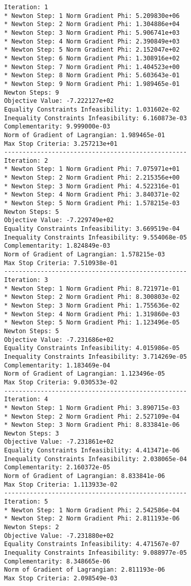 \documentclass{article}
\begin{document}
\scriptsize
\begin{minipage}[t]{0.45\textwidth}
\begin{verbatim}
Iteration: 1
* Newton Step: 1 Norm Gradient Phi: 5.209830e+06
* Newton Step: 2 Norm Gradient Phi: 1.304886e+04
* Newton Step: 3 Norm Gradient Phi: 5.906741e+03
* Newton Step: 4 Norm Gradient Phi: 2.390849e+03
* Newton Step: 5 Norm Gradient Phi: 2.152047e+02
* Newton Step: 6 Norm Gradient Phi: 1.308916e+02
* Newton Step: 7 Norm Gradient Phi: 1.404523e+00
* Newton Step: 8 Norm Gradient Phi: 5.603643e-01
* Newton Step: 9 Norm Gradient Phi: 1.989465e-01
Newton Steps: 9
Objective Value: -7.222127e+02
Equality Constraints Infeasibility: 1.031602e-02
Inequality Constraints Infeasibility: 6.160873e-03
Complementarity: 9.999000e-03
Norm of Gradient of Lagrangian: 1.989465e-01
Max Stop Criteria: 3.257213e+01
--------------------------------------------------
Iteration: 2
* Newton Step: 1 Norm Gradient Phi: 7.075971e+01
* Newton Step: 2 Norm Gradient Phi: 2.215356e+00
* Newton Step: 3 Norm Gradient Phi: 4.522316e-01
* Newton Step: 4 Norm Gradient Phi: 3.840371e-02
* Newton Step: 5 Norm Gradient Phi: 1.578215e-03
Newton Steps: 5
Objective Value: -7.229749e+02
Equality Constraints Infeasibility: 3.669519e-04
Inequality Constraints Infeasibility: 9.554068e-05
Complementarity: 1.824849e-03
Norm of Gradient of Lagrangian: 1.578215e-03
Max Stop Criteria: 7.510938e-01
--------------------------------------------------
Iteration: 3
* Newton Step: 1 Norm Gradient Phi: 8.721971e-01
* Newton Step: 2 Norm Gradient Phi: 8.300803e-02
* Newton Step: 3 Norm Gradient Phi: 1.755636e-02
* Newton Step: 4 Norm Gradient Phi: 1.319860e-03
* Newton Step: 5 Norm Gradient Phi: 1.123496e-05
Newton Steps: 5
Objective Value: -7.231686e+02
Equality Constraints Infeasibility: 4.015986e-05
Inequality Constraints Infeasibility: 3.714269e-05
Complementarity: 1.183469e-04
Norm of Gradient of Lagrangian: 1.123496e-05
Max Stop Criteria: 9.030533e-02
--------------------------------------------------
Iteration: 4
* Newton Step: 1 Norm Gradient Phi: 3.890715e-03
* Newton Step: 2 Norm Gradient Phi: 2.527109e-04
* Newton Step: 3 Norm Gradient Phi: 8.833841e-06
Newton Steps: 3
Objective Value: -7.231861e+02
Equality Constraints Infeasibility: 4.413471e-06
Inequality Constraints Infeasibility: 2.038065e-04
Complementarity: 2.160372e-05
Norm of Gradient of Lagrangian: 8.833841e-06
Max Stop Criteria: 1.113933e-02
--------------------------------------------------
Iteration: 5
* Newton Step: 1 Norm Gradient Phi: 2.542586e-04
* Newton Step: 2 Norm Gradient Phi: 2.811193e-06
Newton Steps: 2
Objective Value: -7.231880e+02
Equality Constraints Infeasibility: 4.471567e-07
Inequality Constraints Infeasibility: 9.088977e-05
Complementarity: 8.348665e-06
Norm of Gradient of Lagrangian: 2.811193e-06
Max Stop Criteria: 2.098549e-03
\end{verbatim}
\end{minipage}
\end{document}

